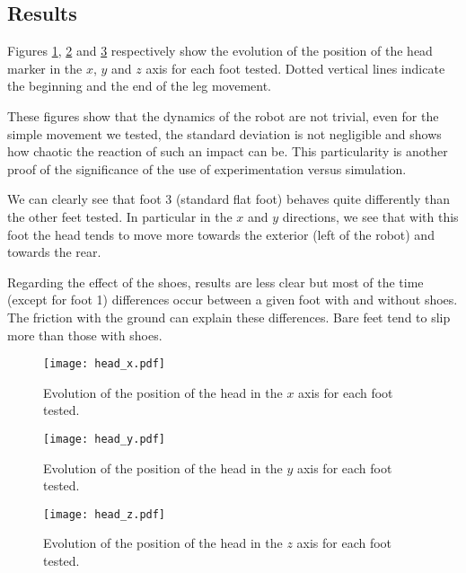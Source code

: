 \subsection{Results} %

Figures \ref{fig:head_x}, \ref{fig:head_y} and \ref{fig:head_z} respectively show the evolution of the position of the head marker in the $x$, $y$ and $z$ axis for each foot tested. Dotted vertical lines indicate the beginning and the end of the leg movement.

These figures show that the dynamics of the robot are not trivial, even for the simple movement we tested, the standard deviation is not negligible and shows how chaotic the reaction of such an impact can be. This particularity is another proof of the significance of the use of experimentation versus simulation.

We can clearly see that foot 3 (standard flat foot) behaves quite differently than the other feet tested. In particular in the $x$ and $y$ directions, we see that with this foot the head tends to move more towards the exterior (left of the robot) and towards the rear.

Regarding the effect of the shoes, results are less clear but most of the time (except for foot 1) differences occur between a given foot with and without shoes. The friction with the ground can explain these differences. Bare feet tend to slip more than those with shoes.



\begin{figure}[ht]
    \begin{center}
        \texttt{[image: head\_x.pdf]}
    \end{center}
    \caption{Evolution of the position of the head in the $x$ axis for
    each foot tested.}
    \label{fig:head_x}
\end{figure}

\begin{figure}[ht]
    \begin{center}
        \texttt{[image: head\_y.pdf]}
    \end{center}
    \caption{Evolution of the position of the head in the $y$ axis for
    each foot tested.}
    \label{fig:head_y}
\end{figure}

\begin{figure}[ht]
    \begin{center}
        \texttt{[image: head\_z.pdf]}
    \end{center}
    \caption{Evolution of the position of the head in the $z$ axis for
    each foot tested.}
    \label{fig:head_z}
\end{figure}


